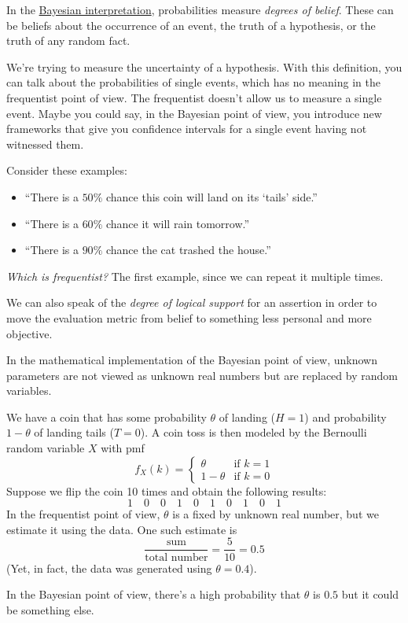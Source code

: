 \begin{definition}
    In the \ul{Bayesian interpretation}, probabilities measure \emph{degrees of belief}. These can be beliefs about the occurrence of an event, the truth of a hypothesis, or the truth of any random fact.

    We're trying to measure the uncertainty of a hypothesis. With this definition, you can talk about the probabilities of single events, which has no meaning in the frequentist point of view. The frequentist doesn't allow us to measure a single event. Maybe you could say, in the Bayesian point of view, you introduce new frameworks that give you confidence intervals for a single event having not witnessed them.
\end{definition}
\begin{example}
    Consider these examples:
    \begin{itemize}
        \item ``There is a $50\%$ chance this coin will land on its `tails' side.''
        \item ``There is a $60\%$ chance it will rain tomorrow.''
        \item ``There is a $90\%$ chance the cat trashed the house.''
    \end{itemize}
    \emph{Which is frequentist?} The first example, since we can repeat it multiple times.

    We can also speak of the \emph{degree of logical support} for an assertion in order to move the evaluation metric from belief to something less personal and more objective.

    In the mathematical implementation of the Bayesian point of view, unknown parameters are not viewed as unknown real numbers but are replaced by random variables.
\end{example}

\begin{example}
    We have a coin that has some probability $\theta$ of landing ($H = 1$) and probability $1-\theta$ of landing tails ($T = 0$). A coin toss is then modeled by the Bernoulli random variable $X$ with \textsf{pmf}
    \[f_X(k) = \begin{cases}
            \theta     & \text{if }k = 1 \\
            1 - \theta & \text{if }k = 0
        \end{cases}\]
    Suppose we flip the coin 10 times and obtain the following results:
    \[1\quad 0 \quad 0 \quad 1 \quad 0 \quad 1 \quad 0\quad 1 \quad 0 \quad 1\]
    In the frequentist point of view, $\theta$ is a fixed by unknown real number, but we estimate it using the data. One such estimate is
    \[\frac{\text{sum}}{\text{total number}} = \frac{5}{10} = 0.5\]
    (Yet, in fact, the data was generated using $\theta = 0.4$).

    In the Bayesian point of view, there's a high probability that $\theta$ is $0.5$ but it could be something else.
\end{example}

